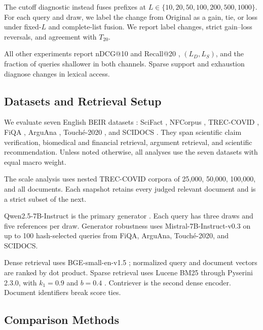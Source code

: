 The cutoff diagnostic instead fuses prefixes at \(L\in\{10,20,50,100,200,500,1000\}\). For each query and draw, we label the change from Original as a gain, tie, or loss under fixed-\(L\) and complete-list fusion. We report label changes, strict gain--loss reversals, and agreement with \(T_{20}\).

All other experiments report nDCG@10 and Recall@20 \citep{jarvelin-kekalainen-2002-cumulated}, \((L_D,L_S)\), and the fraction of queries shallower in both channels. Sparse support and exhaustion diagnose changes in lexical access.

\subsection{Datasets and Retrieval Setup}

\label{datasets-and-retrieval-setup}

We evaluate seven English BEIR datasets \citep{thakur-etal-2021-beir}: SciFact \citep{wadden-etal-2020-fact}, NFCorpus \citep{boteva-etal-2016-fulltext}, TREC-COVID \citep{voorhees-etal-2020-trec-covid}, FiQA \citep{maia-etal-2018-fiqa}, ArguAna \citep{wachsmuth-etal-2018-retrieval}, Touché-2020 \citep{bondarenko-etal-2020-touche}, and SCIDOCS \citep{cohan-etal-2020-specter}. They span scientific claim verification, biomedical and financial retrieval, argument retrieval, and scientific recommendation. Unless noted otherwise, all analyses use the seven datasets with equal macro weight.

The scale analysis uses nested TREC-COVID corpora of 25,000, 50,000, 100,000, and all documents. Each snapshot retains every judged relevant document and is a strict subset of the next.

Qwen2.5-7B-Instruct is the primary generator \citep{qwen-team-2024-qwen25}. Each query has three draws and five references per draw. Generator robustness uses Mistral-7B-Instruct-v0.3 \citep{jiang-etal-2023-mistral} on up to 100 hash-selected queries from FiQA, ArguAna, Touché-2020, and SCIDOCS.

Dense retrieval uses BGE-small-en-v1.5 \citep{xiao-etal-2024-cpack}; normalized query and document vectors are ranked by dot product. Sparse retrieval uses Lucene BM25 through Pyserini 2.3.0, with \(k_1=0.9\) and \(b=0.4\) \citep{robertson-zaragoza-2009-bm25, lin-etal-2021-pyserini}. Contriever \citep{izacard-etal-2022-contriever} is the second dense encoder. Document identifiers break score ties.

\subsection{Comparison Methods}

